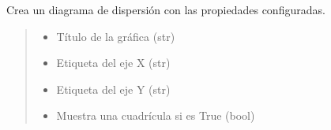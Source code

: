 \documentclass[letterpaper,10pt,spanish]{sphinxmanual}
\begin{document}
\begin{fulllineitems}
\begin{fulllineitems}
\begin{quote}
\begin{description}
\begin{itemize}
\end{itemize}

\end{description}\end{quote}

\end{fulllineitems}


\begin{fulllineitems}
\label{\detokenize{pr8:pr8.2.DataPlotter.scatter}}
\pysigstartsignatures
{}
\pysigstopsignatures
\sphinxAtStartPar
Crea un diagrama de dispersión con las propiedades configuradas.
\begin{quote}\begin{description}
\begin{itemize}
\item {} 
\sphinxAtStartPar
{} \textendash{} Título de la gráfica (str)

\item {} 
\sphinxAtStartPar
{} \textendash{} Etiqueta del eje X (str)

\item {} 
\sphinxAtStartPar
{} \textendash{} Etiqueta del eje Y (str)

\item {} 
\sphinxAtStartPar
{} \textendash{} Muestra una cuadrícula si es True (bool)

\end{itemize}

\end{description}\end{quote}

\end{fulllineitems}


\end{fulllineitems}
\end{document}
